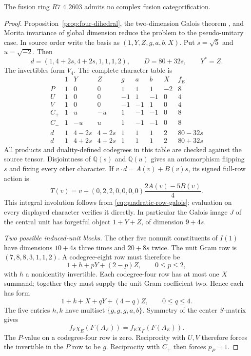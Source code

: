 \begin{theorem}\label{thm:r2603-center-moments}
The fusion ring $R7\_4\_2603$ admits no complex fusion categorification.
\end{theorem}
\begin{proof}
Proposition~\ref{prop:four-dihedral}, the two-dimension Galois theorem
\cite[Lemma~3.1]{Schopieray}, and Morita invariance of global dimension
reduce the problem to the pseudo-unitary case. In source order write
the basis as $(1,Y,Z,g,a,b,X)$. Put $s=\sqrt5$ and $u=\sqrt{-2}$.
Then
\[
 d=(1,4+2s,4+2s,1,1,1,2),\qquad D=80+32s,\qquad Y^*=Z.
\]
The invertibles form $V_4$. The complete character table is
\[
\begin{array}{c|rrrrrrr|c}
 &1&Y&Z&g&a&b&X&f_E\\\hline
 P&1&0&0&1&1&1&-2&8\\
 U&1&0&0&-1&1&-1&0&4\\
 V&1&0&0&-1&-1&1&0&4\\
 C_+&1&u&-u&1&-1&-1&0&8\\
 C_-&1&-u&u&1&-1&-1&0&8\\
 \overline d&1&4-2s&4-2s&1&1&1&2&80-32s\\
 d&1&4+2s&4+2s&1&1&1&2&80+32s
\end{array}
\]
All products and duality-defined codegrees in this table are checked
against the source tensor. Disjointness of $\mathbb Q(s)$ and
$\mathbb Q(u)$ gives an automorphism flipping $s$ and fixing every
other character. If $v\cdot d=A(v)+B(v)s$, its signed full-row action is
\[
 T(v)=v+(0,2,2,0,0,0,0)\frac{2A(v)-5B(v)}4.
\]
This integral involution follows from
\eqref{eq:quadratic-row-galois}; evaluation on every displayed
character verifies it directly. In particular the Galois image $J$
of the central unit has forgetful object $1+Y+Z$, of dimension $9+4s$.

\medskip\noindent\emph{Two possible induced-unit blocks.}
The other five nonunit constituents of $I(1)$ have dimensions
$10+4s$ three times and $20+8s$ twice. The unit Gram row is
$(7,8,8,3,1,1,2)$. A codegree-eight row must therefore be
\[
          1+h+pY+(2-p)Z,\qquad 0\leq p\leq2,
\]
with $h$ a nonidentity invertible. Each codegree-four row has at
most one $X$ summand; together they must supply the unit Gram
coefficient two. Hence each has form
\[
          1+k+X+qY+(4-q)Z,\qquad0\leq q\leq4.
\]
The five entries $h,k$ have multiset $\{g,g,g,a,b\}$.
Symmetry of the center $S$-matrix gives
\begin{equation}\label{eq:r2603-character-reciprocity}
 f_F\chi_E(F(A_F))=f_E\chi_F(F(A_E)).
\end{equation}
The $P$-value on a codegree-four row is zero. Reciprocity with
$U,V$ therefore forces the invertible in the $P$ row to be $g$.
Reciprocity with $C_+$ then forces $p_P=1$.


\end{proof}
